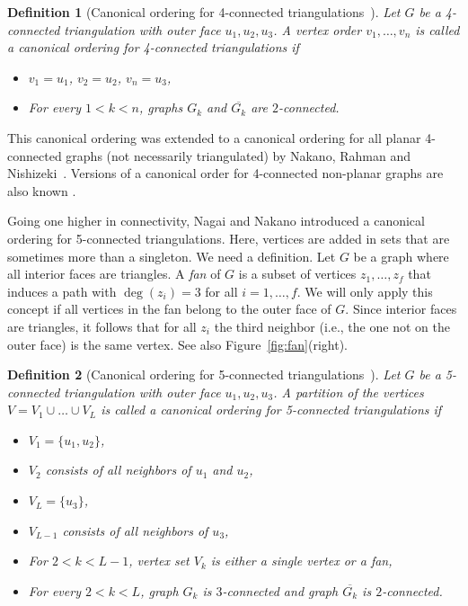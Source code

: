 \documentclass[12pt]{article}
\newtheorem{definition}{Definition}
\begin{document}
\begin{definition}[Canonical ordering for 4-connected triangulations~\cite{KH97}]
\label{def:22-ordering}
Let $G$ be a 4-connected triangulation with outer face $u_1, u_2, u_3$. A vertex order
$v_1,\dots,v_n$ is called a \emph{canonical ordering for 4-connected triangulations} if 
\begin{itemize}
\item $v_1=u_1$, $v_2=u_2$, $v_n=u_3$,
\item For every $1 < k < n$, graphs $G_{k}$ and $\overline{G_k}$ are $2$-connected. 
\end{itemize}
\end{definition}

This canonical ordering was extended to a canonical ordering for all planar 4-connected graphs (not necessarily triangulated) by Nakano, Rahman and Nishizeki~\cite{NRN97}. 
Versions of a canonical order for 4-connected non-planar graphs are also known \cite{CLY05}.

Going one higher in connectivity,
Nagai and Nakano \cite{NN00} introduced a canonical ordering
for 5-connected triangulations.  Here, vertices are added in sets that
are sometimes more than a singleton.  We need a definition.
Let $G$ be a graph where all interior faces are triangles.  A {\em fan} 
of $G$ is a subset of
vertices $z_1,\dots,z_f$ that induces a path with
$\deg(z_i)=3$ for all $i=1,\dots,f$.  We will only apply this
concept if all vertices in the fan belong to the outer face of $G$.
Since interior faces are triangles, it follows that for all $z_i$
the third neighbor (i.e., the one not on the outer face) is the
same vertex.   See also Figure~\ref{fig:fan}(right).

\begin{definition}[Canonical ordering for 5-connected triangulations~\cite{NN00}]
Let $G$ be a 5-connected triangulation with outer face $u_1, u_2, u_3$. A partition of the vertices $V=V_1\cup \dots \cup V_L$ is called a \emph{canonical ordering for 5-connected triangulations} if 
\begin{itemize}
\item $V_1=\{u_1,u_2\}$,
\item $V_2$ consists of all neighbors of $u_1$ and $u_2$,
\item $V_L=\{u_3\}$,
\item $V_{L-1}$ consists of all neighbors of $u_3$,
\item For $2< k<  L-1$, vertex set $V_k$ is either a single vertex or a fan,
\item For every $2 < k < L$, graph $G_{k}$ is $3$-connected and
graph $\overline{G_{k}}$ is $2$-connected. 
\end{itemize}
\end{definition}
\end{document}

